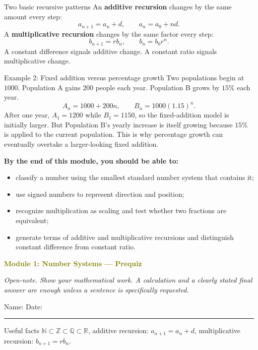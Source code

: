 \documentclass[11pt]{article}
\newcommand{\prequizhead}[2]{%
  \clearpage
  {\Large\bfseries\textcolor{olive}{Module #1: #2 — Prequiz}}\par
  \textit{Open-note. Show your mathematical work. A calculation and a clearly stated final answer are enough unless a sentence is specifically requested.}\par
  Name: \hspace{2.6in} Date: \hspace{1.1in}\par
  \vspace{2pt}\textcolor{gold}{\rule{\linewidth}{1.2pt}}\par\smallskip
}
\begin{document}
\begin{keybox}{Two basic recursive patterns}
An \textbf{additive recursion} changes by the same amount every step:
\[
a_{n+1}=a_n+d,\qquad a_n=a_0+nd.
\]
A \textbf{multiplicative recursion} changes by the same factor every step:
\[
b_{n+1}=rb_n,\qquad b_n=b_0r^n.
\]
A constant difference signals additive change. A constant ratio signals multiplicative change.
\end{keybox}

\begin{examplebox}{Example 2: Fixed addition versus percentage growth}
Two populations begin at \(1000\). Population A gains \(200\) people each year. Population B grows by \(15\%\) each year.
\[
A_n=1000+200n,
\qquad
B_n=1000(1.15)^n.
\]
After one year, \(A_1=1200\) while \(B_1=1150\), so the fixed-addition model is initially larger. But Population B's yearly increase is itself growing because \(15\%\) is applied to the current population. This is why percentage growth can eventually overtake a larger-looking fixed addition.
\end{examplebox}

\textbf{By the end of this module, you should be able to:}
\begin{itemize}
\item classify a number using the smallest standard number system that contains it;
\item use signed numbers to represent direction and position;
\item recognize multiplication as scaling and test whether two fractions are equivalent;
\item generate terms of additive and multiplicative recursions and distinguish constant difference from constant ratio.
\end{itemize}

\prequizhead{1}{Number Systems}
\begin{refbox}{Useful facts}
\(\mathbb N\subset\mathbb Z\subset\mathbb Q\subset\mathbb R\), \qquad
additive recursion: \(a_{n+1}=a_n+d\), \qquad
multiplicative recursion: \(b_{n+1}=rb_n\).
\end{refbox}
\end{document}
